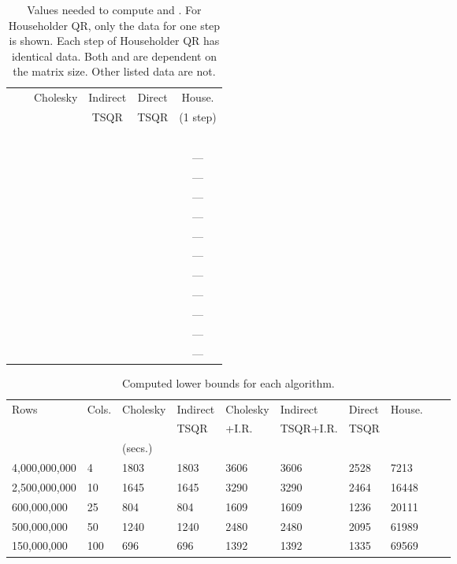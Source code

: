 \documentclass[10pt, conference, compsocconf]{IEEEtran}
\begin{document}
\begin{table}[tbp]
\setlength{\extrarowheight}{0.5pt}
\centering
\caption{Values needed to compute  and .  For Householder QR, only the data for one step is shown.  Each step of Householder QR has identical data.  Both    and  are dependent on the matrix size.  Other listed data are not.}
\begin{tabular}{l l c c c c}
\toprule
\multicolumn{2}{l}{} & Cholesky & Indirect & Direct & House. \\
& & & TSQR & TSQR & (1 step) \\
 \midrule
              &  &  &  &  &  \\
               & &  &  &  &  \\
               & &  &  &  &  \\
               & &  &  &  &  \\
               & &  &  &  &  \\ \midrule
&  &  &  &  & --- \\ \midrule
               &  &  &  &  & --- \\
               & &  &  &  & --- \\
               & &  &  &  & --- \\
               & &  &  &  & --- \\
               & &  &  &  & --- \\
\midrule
&  &  &  &  & --- \\
&  &  &  &  & --- \\ 
 \midrule
&  &  &  &  & ---\\
&  &  &  &  & ---\\
&  &  &  &  & ---\\
\bottomrule
\end{tabular}
\label{tab:parallelism_vars}
\end{table}

\begin{table*}[tbp]
\vspace{-\baselineskip}
\caption{Computed lower bounds for each algorithm.}
\centering
\begin{tabularx}{\linewidth}{llXXXXXXXX}
\toprule
Rows & Cols. & Cholesky & Indirect & Cholesky & Indirect         & Direct & House. \\
           &           &                   & TSQR   & +I.R.         & TSQR+I.R.    & TSQR & \\\cmidrule{3-8}
& & \multicolumn{2}{l}{ (secs.)} \\ \midrule
4,000,000,000 & 4   & 1803  & 1803 & 3606 & 3606 & 2528 & 7213\\
2,500,000,000 & 10 & 1645  & 1645 & 3290 & 3290 & 2464 & 16448\\
600,000,000 & 25    & 804    & 804    & 1609 & 1609 & 1236 & 20111\\
500,000,000 & 50    & 1240  & 1240 & 2480 & 2480 & 2095 & 61989\\
150,000,000 & 100  & 696    & 696   & 1392 & 1392 & 1335 & 69569\\
\bottomrule
\end{tabularx}
\label{tab:lower_bounds}
\end{table*}
\end{document}
